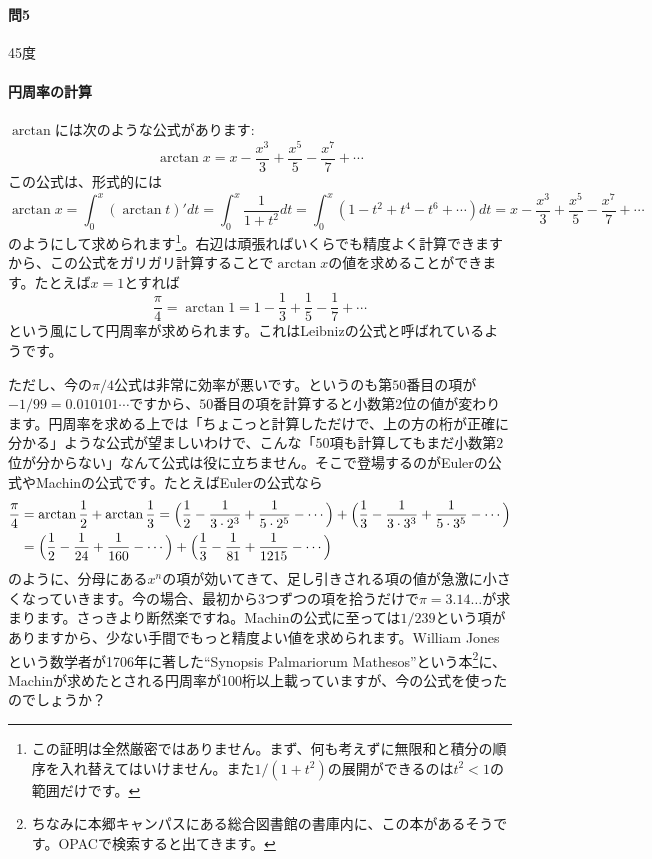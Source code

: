 \paragraph{問5} 45度

\paragraph{円周率の計算}

$\arctan$には次のような公式があります:
\[
\arctan x = x - \frac{x^3}{3} + \frac{x^5}{5} - \frac{x^7}{7} + \cdots
\]
この公式は、形式的には
\[
\arctan x = \int_0^x (\arctan t)' dt = \int_0^x \frac{1}{1+t^2} dt = \int_0^x (1-t^2+t^4-t^6+\cdots) dt
= x - \frac{x^3}{3} + \frac{x^5}{5} - \frac{x^7}{7} + \cdots
\]
のようにして求められます\footnote{この証明は全然厳密ではありません。まず、何も考えずに無限和と積分の順序を入れ替えてはいけません。また$1/(1+t^2)$の展開ができるのは$t^2<1$の範囲だけです。}。右辺は頑張ればいくらでも精度よく計算できますから、この公式をガリガリ計算することで$\arctan x$の値を求めることができます。たとえば$x=1$とすれば
\[
\frac{\pi}{4} = \arctan 1 = 1 - \frac{1}{3} + \frac{1}{5} - \frac{1}{7} + \cdots
\]
という風にして円周率が求められます。これはLeibnizの公式と呼ばれているようです。

ただし、今の$\pi/4$公式は非常に効率が悪いです。というのも第$50$番目の項が$-1/99 = 0.010101\cdots$ですから、$50$番目の項を計算すると小数第$2$位の値が変わります。円周率を求める上では「ちょこっと計算しただけで、上の方の桁が正確に分かる」ような公式が望ましいわけで、こんな「$50$項も計算してもまだ小数第$2$位が分からない」なんて公式は役に立ちません。そこで登場するのがEulerの公式やMachinの公式です。たとえばEulerの公式なら
\begin{align*}
\frac{\pi}{4}
&= \arctan \frac{1}{2} + \arctan \frac{1}{3}
= \Bigl(\frac{1}{2} - \frac{1}{3\cdot 2^3} + \frac{1}{5\cdot 2^5} - \cdots\Bigr)
+ \Bigl(\frac{1}{3} - \frac{1}{3\cdot 3^3} + \frac{1}{5\cdot 3^5} - \cdots\Bigr) \\
&= \Bigl(\frac{1}{2} - \frac{1}{24} + \frac{1}{160} - \cdots\Bigr)
+ \Bigl(\frac{1}{3} - \frac{1}{81} + \frac{1}{1215} - \cdots\Bigr)
\end{align*}
のように、分母にある$x^n$の項が効いてきて、足し引きされる項の値が急激に小さくなっていきます。今の場合、最初から$3$つずつの項を拾うだけで$\pi=3.14\ldots$が求まります。さっきより断然楽ですね。Machinの公式に至っては$1/239$という項がありますから、少ない手間でもっと精度よい値を求められます。William Jonesという数学者が1706年に著した``Synopsis Palmariorum Mathesos''という本\footnote{ちなみに本郷キャンパスにある総合図書館の書庫内に、この本があるそうです。OPACで検索すると出てきます。}に、Machinが求めたとされる円周率が100桁以上載っていますが、今の公式を使ったのでしょうか？

